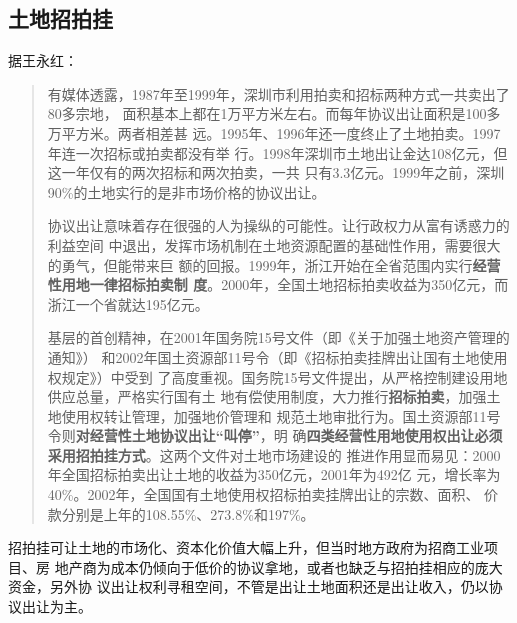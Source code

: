
\subsection{土地招拍挂}
据王永红：
\begin{quotation}
  有媒体透露，1987年至1999年，深圳市利用拍卖和招标两种方式一共卖出了80多宗地，
  面积基本上都在1万平方米左右。而每年协议出让面积是100多万平方米。两者相差甚
  远。1995年、1996年还一度终止了土地拍卖。1997年连一次招标或拍卖都没有举
  行。1998年深圳市土地出让金达108亿元，但这一年仅有的两次招标和两次拍卖，一共
  只有3.3亿元。1999年之前，深圳90\%的土地实行的是非市场价格的协议出让。

  协议出让意味着存在很强的人为操纵的可能性。让行政权力从富有诱惑力的利益空间
  中退出，发挥市场机制在土地资源配置的基础性作用，需要很大的勇气，但能带来巨
  额的回报。1999年，浙江开始在全省范围内实行\textbf{经营性用地一律招标拍卖制
    度}。2000年，全国土地招标拍卖收益为350亿元，而浙江一个省就达195亿元。

  基层的首创精神，在2001年国务院15号文件（即《关于加强土地资产管理的通知》）
  和2002年国土资源部11号令（即《招标拍卖挂牌出让国有土地使用权规定》）中受到
  了高度重视。国务院15号文件提出，从严格控制建设用地供应总量，严格实行国有土
  地有偿使用制度，大力推行\textbf{招标拍卖}，加强土地使用权转让管理，加强地价管理和
  规范土地审批行为。国土资源部11号令则\textbf{对经营性土地协议出让“叫停”}，明
  确\textbf{四类经营性用地使用权出让必须采用招拍挂方式}。这两个文件对土地市场建设的
  推进作用显而易见：2000年全国招标拍卖出让土地的收益为350亿元，2001年为492亿
  元，增长率为40\%。2002年，全国国有土地使用权招标拍卖挂牌出让的宗数、面积、
  价款分别是上年的108.55\%、273.8\%和197\%。
\end{quotation}

招拍挂可让土地的市场化、资本化价值大幅上升，但当时地方政府为招商工业项目、房
地产商为成本仍倾向于低价的协议拿地，或者也缺乏与招拍挂相应的庞大资金，另外协
议出让权利寻租空间，不管是出让土地面积还是出让收入，仍以协议出让为主。

